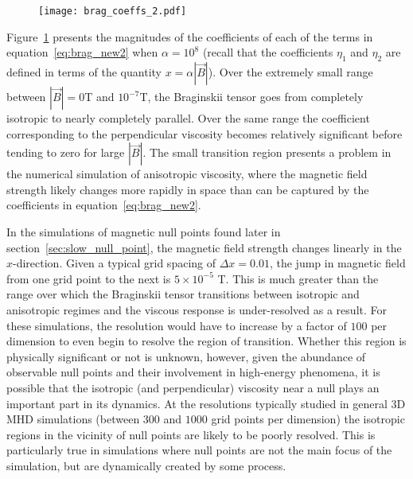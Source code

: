 \begin{figure}[t]
  \centering
  \texttt{[image: brag\_coeffs\_2.pdf]}
  \label{fig:brag_coeffs2}
\end{figure}

Figure~\ref{fig:brag_coeffs2} presents the magnitudes of the coefficients of each of the terms in equation~\eqref{eq:brag_new2} when $\alpha = 10^{8}$ (recall that the coefficients $\eta_1$ and $\eta_2$ are defined in terms of the quantity $x=\alpha |\vec{B}|$). Over the extremely small range between $|\vec{B}| = 0$T and $10^{-7}$T, the Braginskii tensor goes from completely isotropic to nearly completely parallel. Over the same range the coefficient corresponding to the perpendicular viscosity becomes relatively significant before tending to zero for large $|\vec{B}|$. The small transition region presents a problem in the numerical simulation of anisotropic viscosity, where the magnetic field strength likely changes more rapidly in space than can be captured by the coefficients in equation~\eqref{eq:brag_new2}.

In the simulations of magnetic null points found later in section~\ref{sec:slow_null_point}, the magnetic field strength changes linearly in the $x$-direction. Given a typical grid spacing of $\Delta x = 0.01$, the jump in magnetic field from one grid point to the next is $5\times 10^{-5}$ T. This is much greater than the range over which the Braginskii tensor transitions between isotropic and anisotropic regimes and the viscous response is under-resolved as a result. For these simulations, the resolution would have to increase by a factor of $100$ per dimension to even begin to resolve the region of transition. Whether this region is physically significant or not is unknown, however, given the abundance of observable null points and their involvement in high-energy phenomena, it is possible that the isotropic (and perpendicular) viscosity near a null plays an important part in its dynamics. At the resolutions typically studied in general 3D MHD simulations (between $300$ and $1000$ grid points per dimension) the isotropic regions in the vicinity of null points are likely to be poorly resolved. This is particularly true in simulations where null points are not the main focus of the simulation, but are dynamically created by some process.

